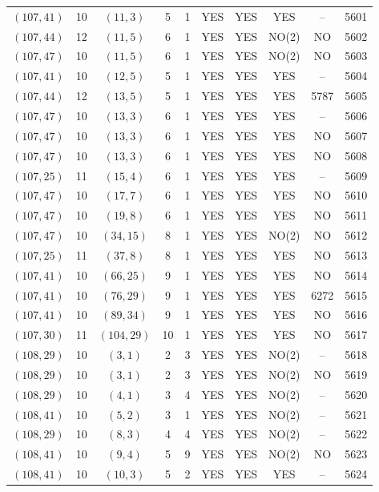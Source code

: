 \begin{longtable}{|c|c|c|c|c|c|c|c|c|c|}
$(107, 41)$ & 10 & $(11, 3)$ & 5 & 1 & YES & YES & YES & -- & 5601\\
$(107, 44)$ & 12 & $(11, 5)$ & 6 & 1 & YES & YES & NO(2) & NO & 5602\\
$(107, 47)$ & 10 & $(11, 5)$ & 6 & 1 & YES & YES & NO(2) & NO & 5603\\
$(107, 41)$ & 10 & $(12, 5)$ & 5 & 1 & YES & YES & YES & -- & 5604\\
$(107, 44)$ & 12 & $(13, 5)$ & 5 & 1 & YES & YES & YES & 5787 & 5605\\
$(107, 47)$ & 10 & $(13, 3)$ & 6 & 1 & YES & YES & YES & -- & 5606\\
$(107, 47)$ & 10 & $(13, 3)$ & 6 & 1 & YES & YES & YES & NO & 5607\\
$(107, 47)$ & 10 & $(13, 3)$ & 6 & 1 & YES & YES & YES & NO & 5608\\
$(107, 25)$ & 11 & $(15, 4)$ & 6 & 1 & YES & YES & YES & -- & 5609\\
$(107, 47)$ & 10 & $(17, 7)$ & 6 & 1 & YES & YES & YES & NO & 5610\\
$(107, 47)$ & 10 & $(19, 8)$ & 6 & 1 & YES & YES & YES & NO & 5611\\
$(107, 47)$ & 10 & $(34, 15)$ & 8 & 1 & YES & YES & NO(2) & NO & 5612\\
$(107, 25)$ & 11 & $(37, 8)$ & 8 & 1 & YES & YES & YES & NO & 5613\\
$(107, 41)$ & 10 & $(66, 25)$ & 9 & 1 & YES & YES & YES & NO & 5614\\
$(107, 41)$ & 10 & $(76, 29)$ & 9 & 1 & YES & YES & YES & 6272 & 5615\\
$(107, 41)$ & 10 & $(89, 34)$ & 9 & 1 & YES & YES & YES & NO & 5616\\
$(107, 30)$ & 11 & $(104, 29)$ & 10 & 1 & YES & YES & YES & NO & 5617\\
$(108, 29)$ & 10 & $(3, 1)$ & 2 & 3 & YES & YES & NO(2) & -- & 5618\\
$(108, 29)$ & 10 & $(3, 1)$ & 2 & 3 & YES & YES & NO(2) & NO & 5619\\
$(108, 29)$ & 10 & $(4, 1)$ & 3 & 4 & YES & YES & NO(2) & -- & 5620\\
$(108, 41)$ & 10 & $(5, 2)$ & 3 & 1 & YES & YES & NO(2) & -- & 5621\\
$(108, 29)$ & 10 & $(8, 3)$ & 4 & 4 & YES & YES & NO(2) & -- & 5622\\
$(108, 41)$ & 10 & $(9, 4)$ & 5 & 9 & YES & YES & NO(2) & NO & 5623\\
$(108, 41)$ & 10 & $(10, 3)$ & 5 & 2 & YES & YES & YES & -- & 5624\\

\end{longtable}
